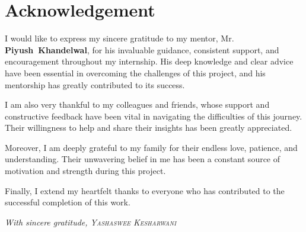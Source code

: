 \section{Acknowledgement}
\vspace{1.0cm}
\Large
I would like to express my sincere gratitude to my mentor, Mr. \textbf{Piyush~Khandelwal}, for his invaluable guidance, consistent support, and encouragement throughout my internship. His deep knowledge and clear advice have been essential in overcoming the challenges of this project, and his mentorship has greatly contributed to its success.

I am also very thankful to my colleagues and friends, whose support and constructive feedback have been vital in navigating the difficulties of this journey. Their willingness to help and share their insights has been greatly appreciated.

Moreover, I am deeply grateful to my family for their endless love, patience, and understanding. Their unwavering belief in me has been a constant source of motivation and strength during this project.

Finally, I extend my heartfelt thanks to everyone who has contributed to the successful completion of this work.

\begin{center}
    \vspace{0.5cm}
    \textit{With sincere gratitude, \textsc{Yashaswee Kesharwani}}
\end{center}
